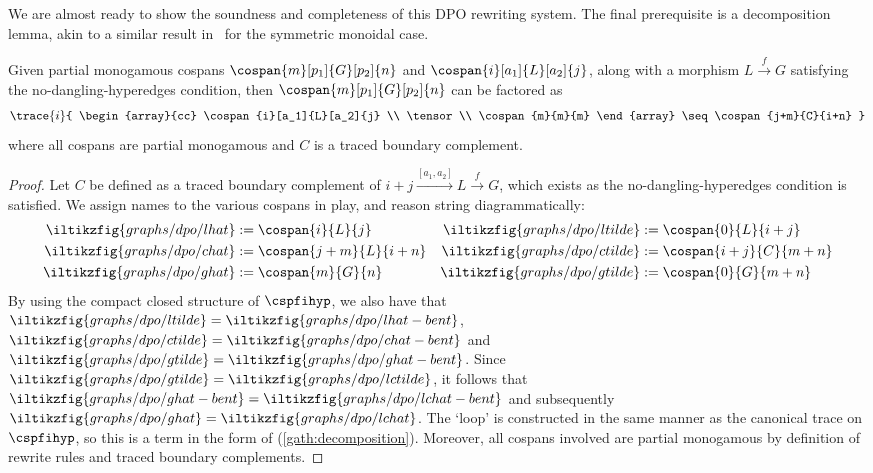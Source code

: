 \noindent
We are almost ready to show the soundness and completeness of this DPO rewriting
system.
The final prerequisite is a decomposition lemma, akin to a similar result
in~\cite{bonchi2021string} for the symmetric monoidal case.

\begin{lemma}\label{lem:decomposition}
    Given partial monogamous cospans \(\cospan{m}[p_1]{G}[p_2]{n}\) and \(
        \cospan{i}[a_1]{L}[a_2]{j}
    \), along with a morphism \(
        L \xrightarrow{f} G
    \) satisfying the no-dangling-hyperedges condition, then \(
        \cospan{m}[p_1]{G}[p_2]{n}
    \) can be factored as
    \begin{gather}
        \trace{i}{
            \begin{array}{cc}
                \cospan{i}[a_1]{L}[a_2]{j} \\
                \tensor \\
                \cospan{m}{m}{m}
            \end{array}
            \seq
            \cospan{j+m}{C}{i+n}
        }
        \label{gath:decomposition}
    \end{gather}
    where all cospans are partial monogamous and \(C\) is a traced boundary
    complement.
\end{lemma}
\begin{proof}
    Let \(C\) be defined as a traced boundary complement of \(
        i+j \xrightarrow{[a_1,a_2]} L \xrightarrow{f} G
    \), which exists as the no-dangling-hyperedges condition is satisfied.
    We assign names to the various cospans in play, and reason string
    diagrammatically:
    \begin{align*}
        \iltikzfig{graphs/dpo/lhat} &:= \cospan{i}{L}{j}
        &
        \iltikzfig{graphs/dpo/ltilde} &:= \cospan{0}{L}{i+j} \\
        \iltikzfig{graphs/dpo/chat} &:= \cospan{j+m}{L}{i+n}
        &
        \iltikzfig{graphs/dpo/ctilde} &:= \cospan{i+j}{C}{m+n} \\
        \iltikzfig{graphs/dpo/ghat} &:= \cospan{m}{G}{n}
        &
        \iltikzfig{graphs/dpo/gtilde} &:= \cospan{0}{G}{m+n}
    \end{align*}
    By using the compact closed structure of \(\cspfihyp\), we also have that \(
        \iltikzfig{graphs/dpo/ltilde} = \iltikzfig{graphs/dpo/lhat-bent}
    \), \(
        \iltikzfig{graphs/dpo/ctilde} = \iltikzfig{graphs/dpo/chat-bent}
    \) and \(
        \iltikzfig{graphs/dpo/gtilde} = \iltikzfig{graphs/dpo/ghat-bent}
    \).
    Since \(
        \iltikzfig{graphs/dpo/gtilde} = \iltikzfig{graphs/dpo/lctilde}
    \), it follows that \(
        \iltikzfig{graphs/dpo/ghat-bent} = \iltikzfig{graphs/dpo/lchat-bent}
    \) and subsequently \(
        \iltikzfig{graphs/dpo/ghat} = \iltikzfig{graphs/dpo/lchat}
    \).
    The `loop' is constructed in the same manner as the canonical trace on
    \(\cspfihyp\), so this is a term in the form of (\ref{gath:decomposition}).
    Moreover, all cospans involved are partial monogamous by definition of
    rewrite rules and traced boundary complements.
\end{proof}

